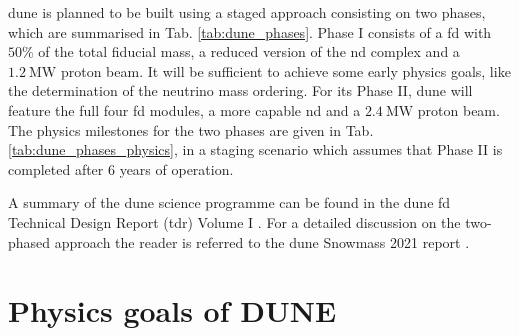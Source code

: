 \gls{dune} is planned to be built using a staged approach consisting on two phases, which are summarised in Tab. \ref{tab:dune_phases}. Phase I consists of a \gls{fd} with $50\%$ of the total fiducial mass, a reduced version of the \gls{nd} complex and a $1.2~\mathrm{MW}$ proton beam. It will be sufficient to achieve some early physics goals, like the determination of the neutrino mass ordering. For its Phase II, \gls{dune} will feature the full four \gls{fd} modules, a more capable \gls{nd} and a $2.4~\mathrm{MW}$ proton beam. The physics milestones for the two phases are given in Tab. \ref{tab:dune_phases_physics}, in a staging scenario which assumes that Phase II is completed after 6 years of operation.

A summary of the \gls{dune} science programme can be found in the \gls{dune} \gls{fd} Technical Design Report (\gls{tdr}) Volume I \cite{DUNE2020TDR1}. For a detailed discussion on the two-phased approach the reader is referred to the \gls{dune} Snowmass 2021 report \cite{DUNE2022Snowmass}.

\section{Physics goals of DUNE}

